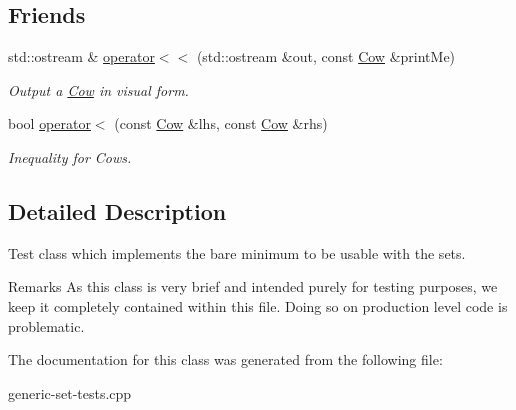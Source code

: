\subsection*{Friends}
\begin{DoxyCompactItemize}
\item 
\hypertarget{class_cow_a23e10f6dc9387f62836b1a11290f7432}{std\-::ostream \& \hyperlink{class_cow_a23e10f6dc9387f62836b1a11290f7432}{operator$<$$<$} (std\-::ostream \&out, const \hyperlink{class_cow}{Cow} \&print\-Me)}\label{class_cow_a23e10f6dc9387f62836b1a11290f7432}

\begin{DoxyCompactList}\small\item\em Output a \hyperlink{class_cow}{Cow} in visual form. \end{DoxyCompactList}\item 
\hypertarget{class_cow_ad9b4faa3b4ff57053311dfc10dc65bf1}{bool \hyperlink{class_cow_ad9b4faa3b4ff57053311dfc10dc65bf1}{operator$<$} (const \hyperlink{class_cow}{Cow} \&lhs, const \hyperlink{class_cow}{Cow} \&rhs)}\label{class_cow_ad9b4faa3b4ff57053311dfc10dc65bf1}

\begin{DoxyCompactList}\small\item\em Inequality for Cows. \end{DoxyCompactList}\end{DoxyCompactItemize}


\subsection{Detailed Description}
Test class which implements the bare minimum to be usable with the sets. 

\begin{DoxyRemark}{Remarks}
As this class is very brief and intended purely for testing purposes, we keep it completely contained within this file. Doing so on production level code is problematic. 
\end{DoxyRemark}


The documentation for this class was generated from the following file\-:\begin{DoxyCompactItemize}
\item 
generic-\/set-\/tests.\-cpp\end{DoxyCompactItemize}

